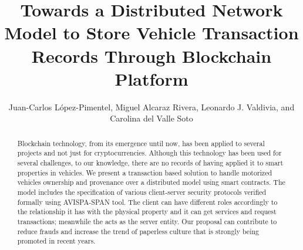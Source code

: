 \begin{frontmatter}






\title{Towards a Distributed Network Model to Store Vehicle Transaction Records Through Blockchain Platform}

\author{Juan-Carlos L\'opez-Pimentel,
        Miguel Alcaraz Rivera,
        Leonardo J. Valdivia,
        and Carolina del Valle Soto%
}

\address{}

\begin{abstract}
Blockchain technology, from its emergence until now, has been applied to several projects and not just for cryptocurrencies. 
Although this technology has been used for several challenges, to our knowledge, there are no 
records of having applied it to smart properties in vehicles.
We present a transaction based solution to handle motorized vehicles ownership and provenance over a distributed model using smart contracts.
The model includes the specification of various client-server security protocols verified formally using AVISPA-SPAN tool.
The client can have different roles accordingly to the relationship it has with the 
physical property and it can get services and request transactions;
meanwhile the \blockchaincarnetwork  acts as the server entity. 
Our proposal can contribute to reduce frauds and increase the trend of 
paperless culture that is strongly being promoted in recent years.




\end{abstract}
\end{frontmatter}
